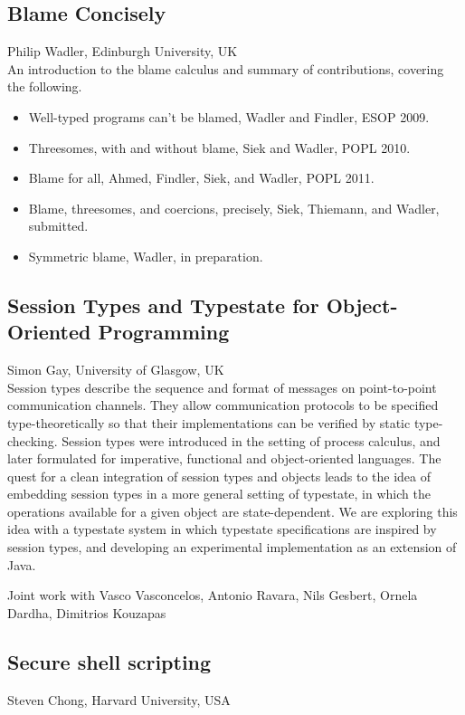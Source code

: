 \documentclass[11pt]{article}
\begin{document}
\subsection*{Blame Concisely}
\noindent Philip Wadler, Edinburgh University, UK \\[0.5ex]

An introduction to the blame calculus and summary of contributions, covering the following.
\begin{itemize}
\item[] Well-typed programs can’t be blamed, Wadler and Findler, ESOP 2009.
\item[] Threesomes, with and without blame, Siek and Wadler, POPL 2010.
\item[] Blame for all, Ahmed, Findler, Siek, and Wadler, POPL 2011.
\item[] Blame, threesomes, and coercions, precisely, Siek, Thiemann, and Wadler, submitted.
\item[] Symmetric blame, Wadler, in preparation.
\end{itemize}

\subsection*{Session Types and Typestate for Object-Oriented Programming}
\noindent Simon Gay, University of Glasgow, UK \\[0.5ex]

Session types describe the sequence and format of messages on
point-to-point communication channels. They allow communication
protocols to be specified type-theoretically so that their
implementations can be verified by static type-checking. Session types
were introduced in the setting of process calculus, and later
formulated for imperative, functional and object-oriented
languages. The quest for a clean integration of session types and
objects leads to the idea of embedding session types in a more general
setting of typestate, in which the operations available for a given
object are state-dependent. We are exploring this idea with a
typestate system in which typestate specifications are inspired by
session types, and developing an experimental implementation as an
extension of Java.

Joint work with Vasco Vasconcelos, Antonio Ravara, Nils Gesbert,
Ornela Dardha, Dimitrios Kouzapas

\subsection*{Secure shell scripting}
\noindent Steven Chong, Harvard University, USA\\[0.5ex]
\end{document}
